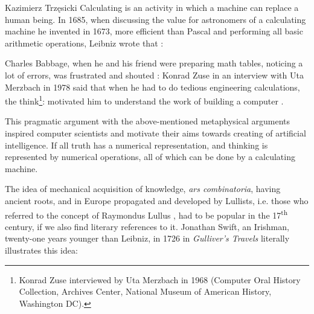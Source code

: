 \begin{artengenv}{Kazimierz Trzęsicki}
Calculating is an activity in which a machine can replace a human being. In 1685, when discussing the value for astronomers of a calculating machine he invented in 1673, more efficient than Pascal and performing all basic arithmetic operations, Leibniz \parencite*[p.181]{Leibniz1685} wrote that \parencite[Ch. I: Leibniz's Dream]{Davis2001}: 

Charles Babbage, when he and his friend were preparing math tables, noticing a lot of errors, was frustrated and shouted \parencite{Swade2002}:  Konrad Zuse in an interview with Uta Merzbach in 1978 said that when he had to do tedious engineering calculations, the think\footnote{Konrad Zuse interviewed by Uta Merzbach in 1968 (Computer Oral History Collection, Archives Center, National Museum of American History, Washington DC).}:  motivated him to understand the work of building a computer \parencite[p.449]{CopelandSprevakShagrir2017}.

This pragmatic argument with the above-mentioned metaphysical arguments inspired computer scientists and motivate their aims   towards creating of artificial intelligence.
If all truth has a numerical representation, and thinking is represented by numerical operations, all of which can be done by a calculating machine.

The idea of mechanical acquisition of knowledge, \emph{ars combinatoria}, having ancient roots, and in Europe propagated and developed by Lullists, i.e. those who referred to the concept of Raymondus Lullus \parencite{Trzesicki2020,Trzesicki2020a}, had to be popular in the 17\textsuperscript{th} century, if we also find literary references to it. Jonathan Swift, an Irishman, twenty-one years younger than Leibniz, in 1726 in \emph{Gulliver's Travels} \parencite*{Swift1892} literally illustrates this idea: 



\end{artengenv}

